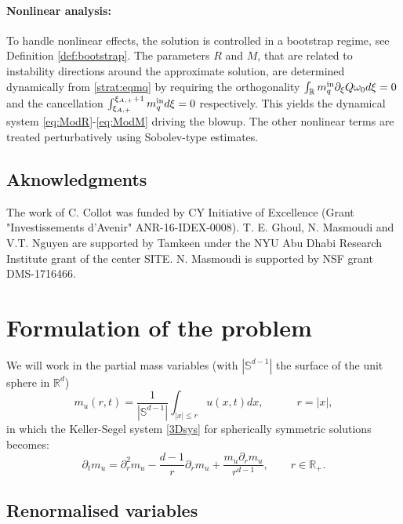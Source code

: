 \documentclass[11pt]{aims}
\theoremstyle{definition}
\newcommand{\Rb}{\mathbb{R}}
\newcommand{\pa}{\partial}
\newcommand{\inn}{\textup{in}}
\numberwithin{equation}{section}
\begin{document}
\vspace{0.2cm}

\paragraph{Nonlinear analysis:} To handle nonlinear effects, the solution is controlled in a bootstrap regime, see Definition \ref{def:bootstrap}. The parameters $R$ and $M$, that are related to instability directions around the approximate solution, are determined dynamically from \eqref{strat:eqmq} by requiring the orthogonality $\int_{\mathbb R}  m_q^\inn \pa_\xi Q\omega_0 d\xi=0$ and the cancellation $\int_{\xi_{A,+}}^{\xi_{A,+}+1} m_q^\inn d\xi=0 $ respectively. This yields the dynamical system \eqref{eq:ModR}-\eqref{eq:ModM} driving the blowup. The other nonlinear terms are treated perturbatively using Sobolev-type estimates.


\subsection{Aknowledgments}

The work of C. Collot was funded by CY Initiative of Excellence (Grant "Investissements d'Avenir" ANR-16-IDEX-0008). T. E. Ghoul, N. Masmoudi and V.T. Nguyen are supported by Tamkeen under the NYU Abu Dhabi Research Institute grant of the center SITE. N. Masmoudi is supported by NSF grant DMS-1716466.


\section{Formulation of the problem} \label{sec:3}

\noindent We will work in the partial mass variables (with $|\mathbb{S}^{d-1}|$ the surface of the unit sphere in $\Rb^d$)
\begin{equation}\label{def:murt}
m_u(r,t) = \frac{1}{|\mathbb{S}^{d-1}|}\int_{|x|\leq r} u(x, t)dx,  \qquad \quad r=|x|,
\end{equation}
in which the Keller-Segel system \eqref{3Dsys} for spherically symmetric solutions becomes:
\begin{equation}\label{eq:murt}
\pa_t m_u = \pa_r^2 m_u -\frac{d-1}{r}\pa_r m_u + \frac{m_u \pa_r m_u}{r^{d-1}}, \qquad r \in \Rb_+.
\end{equation}


\subsection{Renormalised variables} 
\end{document}
